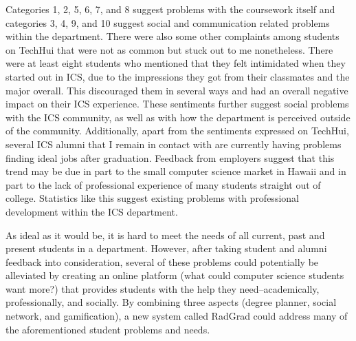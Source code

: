 Categories 1, 2, 5, 6, 7, and 8 suggest problems with the coursework itself and categories 3, 4, 9, and 10 suggest social and communication related problems within the department. There were also some other complaints among students on TechHui that were not as common but stuck out to me nonetheless. There were at least eight students who mentioned that they felt intimidated when they started out in ICS, due to the impressions they got from their classmates and the major overall. This discouraged them in several ways and had an overall negative impact on their ICS experience. These sentiments further suggest social problems with the ICS community, as well as with how the department is perceived outside of the community. Additionally, apart from the sentiments expressed on TechHui, several ICS alumni that I remain in contact with are currently having problems finding ideal jobs after graduation. Feedback from employers suggest that this trend may be due in part to the small computer science market in Hawaii and in part to the lack of professional experience of many students straight out of college. Statistics like this suggest existing problems with professional development within the ICS department. 

As ideal as it would be, it is hard to meet the needs of all current, past and present students in a department. However, after taking student and alumni feedback into consideration, several of these problems could potentially be alleviated by creating an online platform (what could computer science students want more?) that provides students with the help they need--academically, professionally, and socially. By combining three aspects (degree planner, social network, and gamification), a new system called RadGrad could address many of the aforementioned student problems and needs.  

